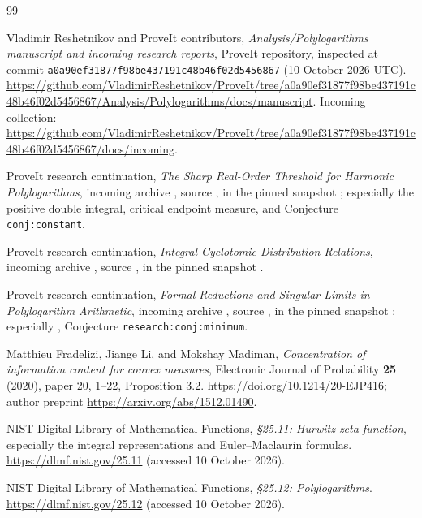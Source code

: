 \documentclass[11pt,a4paper]{article}
\numberwithin{equation}{section}
\theoremstyle{definition}
\theoremstyle{remark}
\begin{document}
\clearpage
\begin{thebibliography}{99}
\raggedright
Vladimir Reshetnikov and ProveIt contributors,
\emph{Analysis/Polylogarithms manuscript and incoming research reports},
ProveIt repository, inspected at commit
\texttt{a0a90ef31877f98be437191c48b46f02d5456867} (10 October 2026 UTC).
\url{https://github.com/VladimirReshetnikov/ProveIt/tree/a0a90ef31877f98be437191c48b46f02d5456867/Analysis/Polylogarithms/docs/manuscript}.
Incoming collection:
\url{https://github.com/VladimirReshetnikov/ProveIt/tree/a0a90ef31877f98be437191c48b46f02d5456867/docs/incoming}.

ProveIt research continuation,
\emph{The Sharp Real-Order Threshold for Harmonic Polylogarithms},
incoming archive ,
source ,
in the pinned snapshot \cite{repo}; especially the positive double
integral, critical endpoint measure, and Conjecture \texttt{conj:constant}.

ProveIt research continuation,
\emph{Integral Cyclotomic Distribution Relations},
incoming archive ,
source ,
in the pinned snapshot \cite{repo}.

ProveIt research continuation,
\emph{Formal Reductions and Singular Limits in Polylogarithm Arithmetic},
incoming archive
,
source ,
in the pinned snapshot \cite{repo}; especially
, Conjecture \texttt{research:conj:minimum}.

Matthieu Fradelizi, Jiange Li, and Mokshay Madiman,
\emph{Concentration of information content for convex measures},
Electronic Journal of Probability \textbf{25} (2020), paper 20, 1--22,
Proposition 3.2.
\url{https://doi.org/10.1214/20-EJP416};
author preprint \url{https://arxiv.org/abs/1512.01490}.

NIST Digital Library of Mathematical Functions,
\emph{\S25.11: Hurwitz zeta function}, especially the integral
representations and Euler--Maclaurin formulas.
\url{https://dlmf.nist.gov/25.11} (accessed 10 October 2026).

NIST Digital Library of Mathematical Functions,
\emph{\S25.12: Polylogarithms}.
\url{https://dlmf.nist.gov/25.12} (accessed 10 October 2026).


\end{thebibliography}
\end{document}
